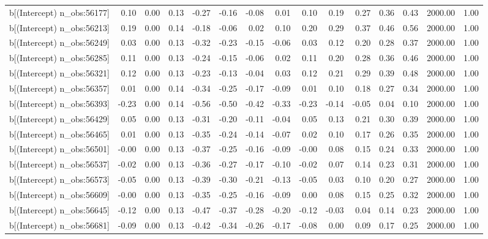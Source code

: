 \begin{table}[ht]
\begin{tabular}{rrrrrrrrrrrrrrr}
  b[(Intercept) n\_obs:56177] & 0.10 & 0.00 & 0.13 & -0.27 & -0.16 & -0.08 & 0.01 & 0.10 & 0.19 & 0.27 & 0.36 & 0.43 & 2000.00 & 1.00 \\ 
  b[(Intercept) n\_obs:56213] & 0.19 & 0.00 & 0.14 & -0.18 & -0.06 & 0.02 & 0.10 & 0.20 & 0.29 & 0.37 & 0.46 & 0.56 & 2000.00 & 1.00 \\ 
  b[(Intercept) n\_obs:56249] & 0.03 & 0.00 & 0.13 & -0.32 & -0.23 & -0.15 & -0.06 & 0.03 & 0.12 & 0.20 & 0.28 & 0.37 & 2000.00 & 1.00 \\ 
  b[(Intercept) n\_obs:56285] & 0.11 & 0.00 & 0.13 & -0.24 & -0.15 & -0.06 & 0.02 & 0.11 & 0.20 & 0.28 & 0.36 & 0.46 & 2000.00 & 1.00 \\ 
  b[(Intercept) n\_obs:56321] & 0.12 & 0.00 & 0.13 & -0.23 & -0.13 & -0.04 & 0.03 & 0.12 & 0.21 & 0.29 & 0.39 & 0.48 & 2000.00 & 1.00 \\ 
  b[(Intercept) n\_obs:56357] & 0.01 & 0.00 & 0.14 & -0.34 & -0.25 & -0.17 & -0.09 & 0.01 & 0.10 & 0.18 & 0.27 & 0.34 & 2000.00 & 1.00 \\ 
  b[(Intercept) n\_obs:56393] & -0.23 & 0.00 & 0.14 & -0.56 & -0.50 & -0.42 & -0.33 & -0.23 & -0.14 & -0.05 & 0.04 & 0.10 & 2000.00 & 1.00 \\ 
  b[(Intercept) n\_obs:56429] & 0.05 & 0.00 & 0.13 & -0.31 & -0.20 & -0.11 & -0.04 & 0.05 & 0.13 & 0.21 & 0.30 & 0.39 & 2000.00 & 1.00 \\ 
  b[(Intercept) n\_obs:56465] & 0.01 & 0.00 & 0.13 & -0.35 & -0.24 & -0.14 & -0.07 & 0.02 & 0.10 & 0.17 & 0.26 & 0.35 & 2000.00 & 1.00 \\ 
  b[(Intercept) n\_obs:56501] & -0.00 & 0.00 & 0.13 & -0.37 & -0.25 & -0.16 & -0.09 & -0.00 & 0.08 & 0.15 & 0.24 & 0.33 & 2000.00 & 1.00 \\ 
  b[(Intercept) n\_obs:56537] & -0.02 & 0.00 & 0.13 & -0.36 & -0.27 & -0.17 & -0.10 & -0.02 & 0.07 & 0.14 & 0.23 & 0.31 & 2000.00 & 1.00 \\ 
  b[(Intercept) n\_obs:56573] & -0.05 & 0.00 & 0.13 & -0.39 & -0.30 & -0.21 & -0.13 & -0.05 & 0.03 & 0.10 & 0.20 & 0.27 & 2000.00 & 1.00 \\ 
  b[(Intercept) n\_obs:56609] & -0.00 & 0.00 & 0.13 & -0.35 & -0.25 & -0.16 & -0.09 & 0.00 & 0.08 & 0.15 & 0.25 & 0.32 & 2000.00 & 1.00 \\ 
  b[(Intercept) n\_obs:56645] & -0.12 & 0.00 & 0.13 & -0.47 & -0.37 & -0.28 & -0.20 & -0.12 & -0.03 & 0.04 & 0.14 & 0.23 & 2000.00 & 1.00 \\ 
  b[(Intercept) n\_obs:56681] & -0.09 & 0.00 & 0.13 & -0.42 & -0.34 & -0.26 & -0.17 & -0.08 & 0.00 & 0.09 & 0.17 & 0.25 & 2000.00 & 1.00 \\ 

\end{tabular}
\end{table}
